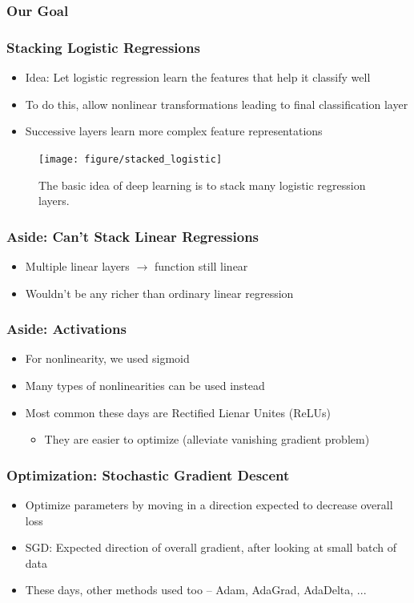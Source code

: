 \documentclass[10pt,mathserif]{beamer}
\begin{document}
\begin{frame}
  \frametitle{Our Goal}
\end{frame}

\begin{frame}
  \frametitle{Stacking Logistic Regressions}
  \begin{itemize}
  \item Idea: Let logistic regression learn the features that help it classify
    well
  \item To do this, allow nonlinear transformations leading to final
    classification layer
  \item Successive layers learn more complex feature representations
  \end{itemize}
  \begin{figure}
      \centering
      \texttt{[image: figure/stacked\_logistic]}
      \caption{The basic idea of deep learning is to stack many logistic
        regression layers. \label{fig:stacked_logistic} }
\end{figure}
\end{frame}

\begin{frame}
  \frametitle{Aside: Can't Stack Linear Regressions}
  \begin{itemize}
  \item Multiple linear layers $\rightarrow$ function still linear
  \item Wouldn't be any richer than ordinary linear regression
  \end{itemize} 

\end{frame}

\begin{frame}
  \frametitle{Aside: Activations}
  \begin{itemize}
  \item For nonlinearity, we used sigmoid
  \item Many types of nonlinearities can be used instead
  \item Most common these days are Rectified Lienar Unites (ReLUs)
    \begin{itemize}
    \item They are easier to optimize (alleviate vanishing gradient problem)
    \end{itemize}
  \end{itemize} 
\end{frame}

\begin{frame}
  \frametitle{Optimization: Stochastic Gradient Descent}
  \begin{itemize}
  \item Optimize parameters by moving in a direction expected to decrease
    overall loss
  \item SGD: Expected direction of overall gradient, after looking at small
    batch of data
  \item These days, other methods used too -- Adam, AdaGrad, AdaDelta, ...
  \end{itemize}
\end{frame}
\end{document}

